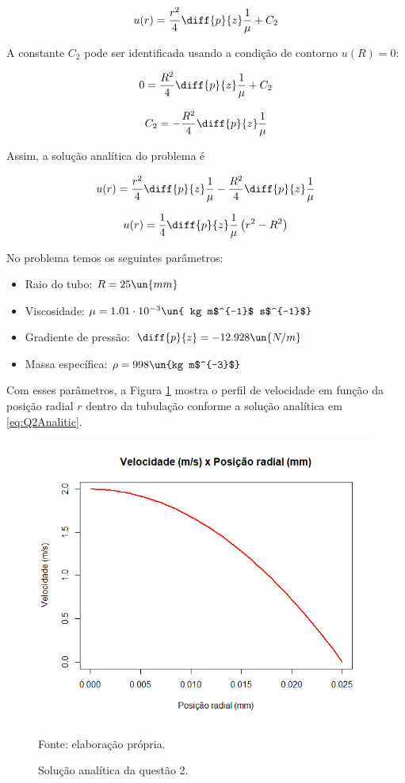 \[ u(r) = \frac{r^2}{4} \diff{p}{z} \frac{1}{\mu} + C_2 \]

A constante $C_2$ pode ser identificada usando a condição de contorno $u(R) = 0$:

\[ 0 = \frac{R^2}{4} \diff{p}{z} \frac{1}{\mu} + C_2 \]

\[ C_2 = - \frac{R^2}{4} \diff{p}{z} \frac{1}{\mu} \]

Assim, a solução analítica do problema é

\[ u(r) = \frac{r^2}{4} \diff{p}{z} \frac{1}{\mu} - \frac{R^2}{4} \diff{p}{z} \frac{1}{\mu}  \]

\begin{equation}\label{eq:Q2Analitic}
    u(r) = \frac{1}{4} \diff{p}{z} \frac{1}{\mu} \left(r^2 - R^2\right)
\end{equation}

No problema temos os seguintes parâmetros:

\begin{itemize}
    \item Raio do tubo: $R=25 \un{mm}$
    \item Viscosidade: $\mu=1.01 \cdot 10^{-3} \un{ kg m$^{-1}$ s$^{-1}$}$
    \item Gradiente de pressão: $\diff{p}{z}=-12.928 \un{N/m}$
    \item Massa específica: $\rho=998 \un{kg m$^{-3}$}$
\end{itemize}

Com esses parâmetros, a Figura \ref*{fig:graficoAnaliticoQ2} mostra o perfil
de velocidade em função da posição radial $r$ dentro da tubulação conforme a solução analítica em
\eqref{eq:Q2Analitic}.

\begin{figure}[h!]
    \caption{Solução analítica da questão 2.}
    \label{fig:graficoAnaliticoQ2}
    \centering
    \centerline{\includegraphics[scale=0.5]{graficoAnaliticoQ2.png}}
    \par{Fonte: elaboração própria.}
\end{figure}

